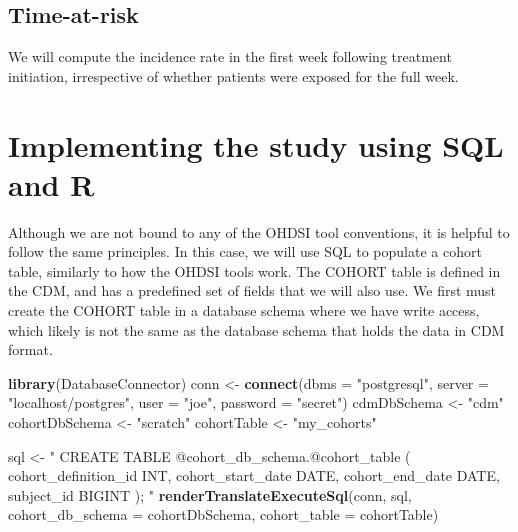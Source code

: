 \documentclass[11pt]{book}
\newenvironment{Shaded}{\begin{snugshade}}{\end{snugshade}}
\newcommand{\KeywordTok}[1]{\textcolor[rgb]{0.13,0.29,0.53}{\textbf{#1}}}
\newcommand{\DataTypeTok}[1]{\textcolor[rgb]{0.13,0.29,0.53}{#1}}
\newcommand{\StringTok}[1]{\textcolor[rgb]{0.31,0.60,0.02}{#1}}
\newcommand{\NormalTok}[1]{#1}
\begin{document}
\subsection{Time-at-risk}\label{time-at-risk}

We will compute the incidence rate in the first week following treatment
initiation, irrespective of whether patients were exposed for the full
week.

\section{Implementing the study using SQL and
R}\label{implementing-the-study-using-sql-and-r}

Although we are not bound to any of the OHDSI tool conventions, it is
helpful to follow the same principles. In this case, we will use SQL to
populate a cohort table, similarly to how the OHDSI tools work. The
COHORT table is defined in the CDM, and has a predefined set of fields
that we will also use. We first must create the COHORT table in a
database schema where we have write access, which likely is not the same
as the database schema that holds the data in CDM format.

\begin{Shaded}
\begin{Highlighting}[]
\KeywordTok{library}\NormalTok{(DatabaseConnector)}
\NormalTok{conn <-}\StringTok{ }\KeywordTok{connect}\NormalTok{(}\DataTypeTok{dbms =} \StringTok{"postgresql"}\NormalTok{,}
                \DataTypeTok{server =} \StringTok{"localhost/postgres"}\NormalTok{,}
                \DataTypeTok{user =} \StringTok{"joe"}\NormalTok{,}
                \DataTypeTok{password =} \StringTok{"secret"}\NormalTok{)}
\NormalTok{cdmDbSchema <-}\StringTok{ "cdm"}
\NormalTok{cohortDbSchema <-}\StringTok{ "scratch"}
\NormalTok{cohortTable <-}\StringTok{ "my_cohorts"}

\NormalTok{sql <-}\StringTok{ "}
\StringTok{CREATE TABLE @cohort_db_schema.@cohort_table (}
\StringTok{  cohort_definition_id INT,}
\StringTok{  cohort_start_date DATE,}
\StringTok{  cohort_end_date DATE,}
\StringTok{  subject_id BIGINT}
\StringTok{);}
\StringTok{"}
\KeywordTok{renderTranslateExecuteSql}\NormalTok{(conn, sql,}
                          \DataTypeTok{cohort_db_schema =}\NormalTok{ cohortDbSchema,}
                          \DataTypeTok{cohort_table =}\NormalTok{ cohortTable)}
\end{Highlighting}
\end{Shaded}
\end{document}
